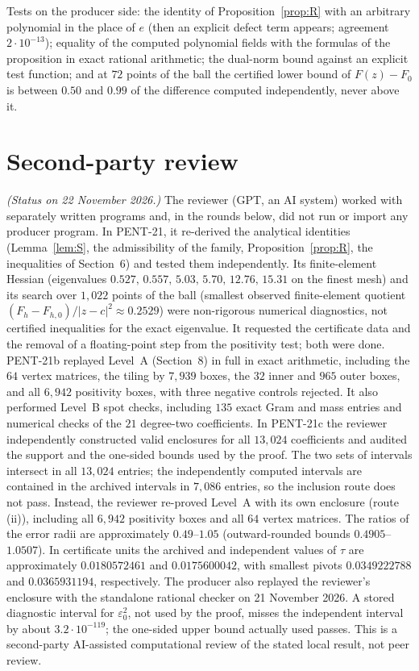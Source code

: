 \documentclass[11pt]{article}
\theoremstyle{remark}
\begin{document}
Tests on the producer side: the identity of Proposition~\ref{prop:R} with an arbitrary polynomial in the place of $e$
(then an explicit defect term appears; agreement $2\cdot10^{-13}$); equality of the computed polynomial fields with
the formulas of the proposition in exact rational arithmetic; the dual-norm bound against an explicit test function;
and at $72$ points of the ball the certified lower bound of $F(z)-F_0$ is between $0.50$ and $0.99$ of the
difference computed independently, never above it.

\section{Second-party review}\label{sec:replay}
\emph{(Status on 22 November 2026.)} The reviewer (GPT, an AI system) worked with separately written programs and,
in the rounds below, did not run or import any producer program. In PENT-21, it re-derived the analytical identities
(Lemma~\ref{lem:S}, the admissibility of the family, Proposition~\ref{prop:R}, the inequalities of Section~6) and
tested them independently. Its finite-element Hessian (eigenvalues $0.527,\,0.557,\,5.03,\,5.70,\,12.76,\,15.31$ on the
finest mesh) and its search over $1{,}022$ points of the ball (smallest observed finite-element quotient
$(F_h-F_{h,0})/|z-c|^2\approx0.2529$) were non-rigorous numerical diagnostics, not certified inequalities for the exact
eigenvalue. It requested the certificate data and the removal of a floating-point step from the positivity test; both
were done. PENT-21b replayed Level~A (Section~8) in full in exact arithmetic, including the $64$ vertex matrices, the
tiling by $7{,}939$ boxes, the $32$ inner and $965$ outer boxes, and all $6{,}942$ positivity boxes, with three
negative controls rejected. It also performed Level~B spot checks, including $135$ exact Gram and mass entries and
numerical checks of the $21$ degree-two coefficients. In PENT-21c the reviewer independently constructed valid
enclosures for all $13{,}024$ coefficients and audited the support and the one-sided bounds used by the proof. The two
sets of intervals intersect in all $13{,}024$ entries; the independently computed intervals are contained in the
archived intervals in $7{,}086$ entries, so the inclusion route does not pass. Instead, the reviewer re-proved Level~A
with its own enclosure (route (ii)), including all $6{,}942$ positivity boxes and all $64$ vertex matrices. The ratios of
the error radii are approximately $0.49$--$1.05$ (outward-rounded bounds $0.4905$--$1.0507$). In certificate units the
archived and independent values of $\tau$ are approximately $0.0180572461$ and $0.0175600042$, with smallest pivots
$0.0349222788$ and $0.0365931194$, respectively. The producer also replayed the reviewer's enclosure with the standalone
rational checker on 21 November 2026. A stored diagnostic interval for $\varepsilon_0^2$, not used by the proof, misses
the independent interval by about $3.2\cdot10^{-119}$; the one-sided upper bound actually used passes. This is a
second-party AI-assisted computational review of the stated local result, not peer review.
\end{document}
